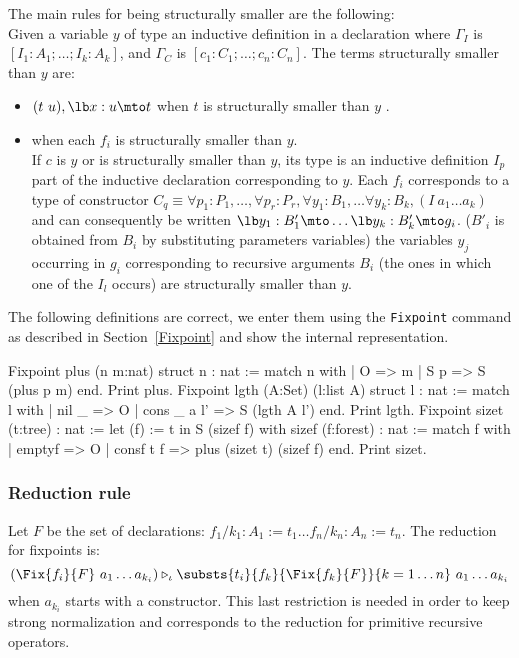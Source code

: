 The main rules for being structurally smaller are the following:\\
Given a variable $y$ of type an inductive
definition in a declaration 
where $\Gamma_I$ is $[I_1:A_1;\ldots;I_k:A_k]$, and $\Gamma_C$ is
  $[c_1:C_1;\ldots;c_n:C_n]$.
The terms structurally smaller than $y$ are:
\begin{itemize}
\item $(t~u), \lb x:u \mto t$ when $t$ is structurally smaller than $y$ .
\item {} when each $f_i$ is structurally
  smaller than $y$. \\
  If $c$ is $y$ or is structurally smaller than $y$, its type is an inductive
  definition $I_p$ part of the inductive
  declaration corresponding to $y$. 
  Each $f_i$ corresponds to a type of constructor $C_q \equiv
  \forall p_1:P_1,\ldots,\forall p_r:P_r, \forall y_1:B_1, \ldots \forall y_k:B_k, (I~a_1\ldots a_k)$ 
  and can consequently be
  written $\lb y_1:B'_1\mto \ldots \lb y_k:B'_k\mto g_i$.
  ($B'_i$ is obtained from $B_i$ by substituting parameters variables)
  the variables $y_j$ occurring
  in $g_i$ corresponding to recursive arguments $B_i$ (the ones in
  which one of the $I_l$ occurs) are structurally smaller than $y$.
\end{itemize}
The following definitions are correct, we enter them using the
{\tt Fixpoint} command as described in Section~\ref{Fixpoint} and show
the internal representation.
\begin{coq_example}
Fixpoint plus (n m:nat) {struct n} : nat :=
  match n with
  | O => m
  | S p => S (plus p m)
  end.
Print plus.
Fixpoint lgth (A:Set) (l:list A) {struct l} : nat :=
  match l with
  | nil _ => O
  | cons _ a l' => S (lgth A l')
  end.
Print lgth.
Fixpoint sizet (t:tree) : nat := let (f) := t in S (sizef f)
 with sizef (f:forest) : nat :=
  match f with
  | emptyf => O
  | consf t f => plus (sizet t) (sizef f)
  end.
Print sizet.
\end{coq_example}


\subsubsection[Reduction rule]{Reduction rule}
Let $F$ be the set of declarations: $f_1/k_1:A_1:=t_1 \ldots
f_n/k_n:A_n:=t_n$.
The reduction for fixpoints is:
\[ (\Fix{f_i}{F}~a_1\ldots
a_{k_i}) \triangleright_{\iota} \substs{t_i}{f_k}{\Fix{f_k}{F}}{k=1\ldots n}
~a_1\ldots a_{k_i}\]
when $a_{k_i}$ starts with a constructor.
This last restriction is needed in order to keep strong normalization
and corresponds to the reduction for primitive recursive operators.

